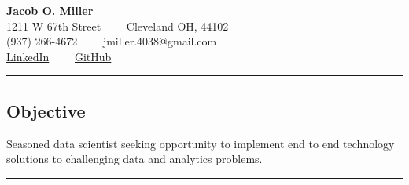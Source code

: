 \documentclass[10pt,letterpaper]{article}
\newenvironment{indentsection}[1]%
{\begin{list}{}%
	{\setlength{\leftmargin}{#1}}%
	\item[]%
}
{\end{list}}
\begin{document}
\thispagestyle{empty}

\begin{center}
{\LARGE \textbf{Jacob O. Miller}}\\

1211 W 67th Street\ \ \textbullet
\ \ Cleveland OH, 44102
\\
(937) 266-4672\ \ \textbullet
\ \ jmiller.4038@gmail.com
\\
\href{https://www.linkedin.com/in/jacob-miller-2ab1b617}{LinkedIn}\ \ \textbullet
\ \ \href{https://github.com/jmiller4038}{GitHub}
\end{center}
\hrule
\vspace{-0.4em}

\subsection*{Objective}

\begin{indentsection}{\parindent}
Seasoned data scientist seeking opportunity to implement end to end technology solutions to challenging data and analytics problems.
\end{indentsection}

\hrule
\vspace{-0.4em}
\end{document}
